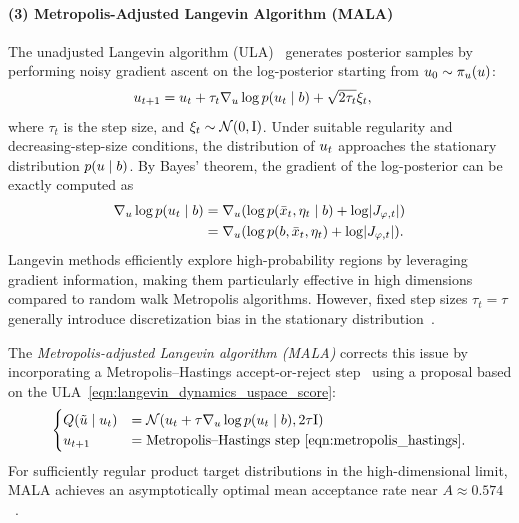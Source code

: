 \paragraph*{(3) Metropolis-Adjusted Langevin Algorithm (\gls*{MALA})}

The unadjusted Langevin algorithm (\gls*{ULA})~\citep{bakry_diffusions_1985} generates posterior samples by performing noisy gradient ascent on the log-posterior starting from $u_{0} \sim \pi_{u}(u)$:
\begin{align}\label{eqn:langevin_dynamics_uspace}
    u_{t+1} & = u_{t} + \tau_{t} \nabla_{u} \log p(u_{t} \mid b) + \sqrt{2 \tau_{t}} \xi_{t},
\end{align}
where $\tau_{t}$ is the step size, and $\xi_{t}\sim\mathcal{N}(\mathrm{0},\mathrm{I})$.
Under suitable regularity and decreasing-step-size conditions, the distribution of $u_{t}$ approaches the stationary distribution $p(u \mid b)$.
By Bayes' theorem, the gradient of the log-posterior can be exactly computed as
\begin{align}\label{eqn:langevin_dynamics_uspace_score}
    \begin{split}
        \nabla_{\vv{u}} \log p(\vv{u}_{t} \mid \signal) & = \nabla_{\vv{u}} (\log p(\bar{\distbn}_{t}, \eta_{t} \mid \signal) + \log\AbsDet{\vv{J}_{\varphi,t}}) \\
        & = \nabla_{\vv{u}} (\log p(\signal, \bar{\distbn}_{t}, \eta_{t}) + \log\AbsDet{\vv{J}_{\varphi,t}}).
    \end{split}
\end{align}
Langevin methods efficiently explore high-probability regions by leveraging gradient information, making them particularly effective in high dimensions compared to random walk Metropolis algorithms.
However, fixed step sizes $\tau_t = \tau$ generally introduce discretization bias in the stationary distribution~\citep{roberts_exponential_1996}.

The \textit{Metropolis-adjusted Langevin algorithm (\gls*{MALA})} corrects this issue by incorporating a Metropolis--Hastings accept-or-reject step~\citep{roberts_optimal_1998} using a proposal based on the \gls*{ULA}~\eqref{eqn:langevin_dynamics_uspace_score}:
\begin{align}
    \begin{cases}
        Q(\tilde{u} \mid u_{t}) & = \mathcal{N}(u_{t} + \tau \nabla_{u} \log p(u_{t} \mid b), 2 \tau \mathrm{I}) \\
        u_{t+1}                      & = \text{Metropolis--Hastings step \eqref{eqn:metropolis_hastings}}.
    \end{cases}
\end{align}
For sufficiently regular product target distributions in the high-dimensional limit, \gls*{MALA} achieves an asymptotically optimal mean acceptance rate near $A \approx 0.574$~\citep{roberts_optimal_1998}.

